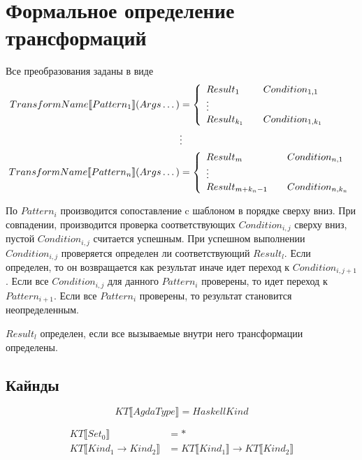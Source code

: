 \section{Формальное определение трансформаций}\label{sec:appendix-transformations}

Все преобразования заданы в виде
\begin{align*}
TransformName\llbracket Pattern_1 \rrbracket(Args\dots) &= \left\{
   \begin{array}{l l}
   Result_1 &\quad Condition_{1,1}\\
   \vdots\\
   Result_{k_1} &\quad Condition_{1,k_1}
   \end{array}\right.\\
&\vdots\\
TransformName\llbracket Pattern_n \rrbracket(Args\dots) &= \left\{
   \begin{array}{l l}
   Result_m &\quad Condition_{n,1}\\
   \vdots\\
   Result_{m+k_n-1} &\quad Condition_{n,k_n}
   \end{array}\right.
\end{align*}

По \(Pattern_i\) производится сопоставление c шаблоном в порядке сверху вниз.
При совпадении, производится проверка соответствующих \(Condition_{i,j}\) сверху вниз,
пустой \(Condition_{i,j}\) считается успешным.
При успешном выполнении \(Condition_{i,j}\) проверяется определен ли соответствующий
\(Result_l\). Если определен, то он возвращается как результат иначе идет переход
к \(Condition_{i,j+1}\). Если все \(Condition_{i,j}\) для данного \(Pattern_i\)
проверены, то идет переход к \(Pattern_{i+1}\). Если все \(Pattern_i\) проверены,
то результат становится неопределенным.

\(Result_l\) определен, если все вызываемые внутри него трансформации определены.

\subsection{Кайнды}
\[
KT\llbracket AgdaType \rrbracket = HaskellKind
\]

\begin{align*}
KT\llbracket Set_0 \rrbracket &= *\\
KT\llbracket Kind_1 \rightarrow Kind_2 \rrbracket &=
   KT\llbracket Kind_1 \rrbracket \rightarrow KT\llbracket Kind_2 \rrbracket
\end{align*}

